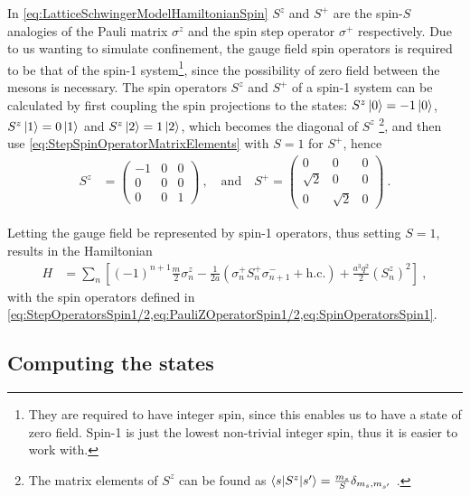 \documentclass[../main.tex]{subfiles} %
\begin{document}
In \cref{eq:LatticeSchwingerModelHamiltonianSpin} $S^z$ and $S^+$ are the spin-$S$ analogies of the Pauli matrix $\sigma^z$ and the spin step operator $\sigma^+$ respectively. Due to us wanting to simulate confinement, the gauge field spin operators is required to be that of the spin-1 system\footnote{They are required to have integer spin, since this enables us to have a state of zero field. Spin-1 is just the lowest non-trivial integer spin, thus it is easier to work with.}, since the possibility of zero field between the mesons is necessary. The spin operators $S^z$ and $S^+$ of a spin-1 system can be calculated by first coupling the spin projections to the states: $S^z\ket{0} = -1\ket{0}$, $S^z\ket{1} = 0\ket{1}$ and $S^z\ket{2} = 1\ket{2}$, which becomes the diagonal of $S^z$ \footnote{The matrix elements of $S^z$ can be found as $\mel**{s}{S^z}{s'} = \frac{m_s}{S} \delta_{m_s,m_{s'}}$ \cite{sakurai_modernQM_2017}.}, and then use \cref{eq:StepSpinOperatorMatrixElements} with $S=1$ for $S^+$, hence
\begin{align} \label{eq:SpinOperatorsSpin1}
    S^z &= \begin{pmatrix} -1 & 0 & 0 \\ 0 & 0 & 0 \\ 0 & 0 & 1 \end{pmatrix}
    \: , \quad \text{and} \quad
    S^+ = \begin{pmatrix} 0 & 0 & 0 \\ \sqrt{2} & 0 & 0 \\ 0 & \sqrt{2} & 0 \end{pmatrix} \: .
\end{align}

Letting the gauge field be represented by spin-1 operators, thus setting $S = 1$, results in the Hamiltonian
\begin{align} \label{eq:LatticeSchwingerModelHamiltonianSpin_Actual}
    H &= \sum_n \left[ (-1)^{n+1} \frac{m}{2} \sigma_n^z - \frac{1}{2a} \left( \sigma_n^+ S_n^+ \sigma_{n+1}^- + \mathrm{h.c.} \right) + \frac{a^3 q^2}{2} \left( S_n^z \right)^2 \right] \: ,
\end{align}
with the spin operators defined in \cref{eq:StepOperatorsSpin1/2,eq:PauliZOperatorSpin1/2,eq:SpinOperatorsSpin1}.



\subsection{Computing the states} \label{sec:StateComputing}
\end{document}
